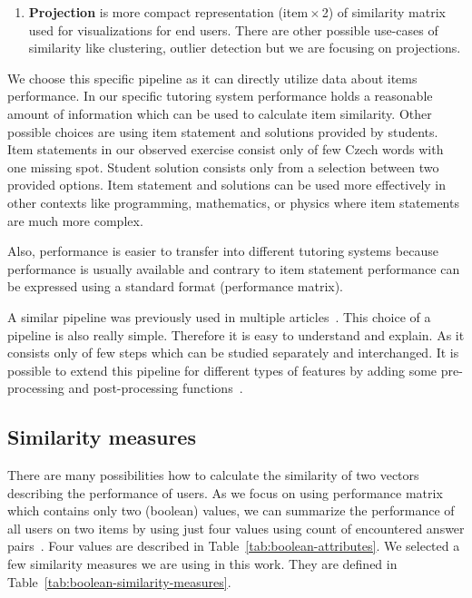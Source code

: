 \documentclass[
  printed, %
  table,   %
  nolof,     %
  nolot,     %
  color,
  final,
  nocover
]{fithesis3}
\begin{document}
\begin{enumerate}
  \item
    \textbf{Projection} is more compact representation (item\,$\times$\,2) of similarity matrix used for visualizations for end users. There are other possible use-cases of similarity like clustering, outlier detection but we are focusing on projections.
\end{enumerate}


We choose this specific pipeline as it can directly utilize data about items performance. In our specific tutoring system performance holds a reasonable amount of information which can be used to calculate item similarity. Other possible choices are using item statement and solutions provided by students. Item statements in our observed exercise consist only of few Czech words with one missing spot. Student solution consists only from a selection between two provided options. Item statement and solutions can be used more effectively in other contexts like programming, mathematics, or physics where item statements are much more complex.

Also, performance is easier to transfer into different tutoring systems because performance is usually available and contrary to item statement performance can be expressed using a standard format (performance matrix).

A similar pipeline was previously used in multiple articles~\cite{pelanek2018programming, kaser2013cluster}. This choice of a pipeline is also really simple. Therefore it is easy to understand and explain. As it consists only of few steps which can be studied separately and interchanged. It is possible to extend this pipeline for different types of features by adding some pre-processing and post-processing functions~\cite{kaser2013cluster}.


\subsection{Similarity measures}\label{similarity-measures}

There are many possibilities how to calculate the similarity of two vectors describing the performance of users. As we focus on using performance matrix which contains only two (boolean) values, we can summarize the performance of all users on two items by using just four values using count of encountered answer pairs~\cite{choi2010survey}. Four values are described in Table~\ref{tab:boolean-attributes}. We selected a few similarity measures we are using in this work. They are defined in Table~\ref{tab:boolean-similarity-measures}.
\end{document}
